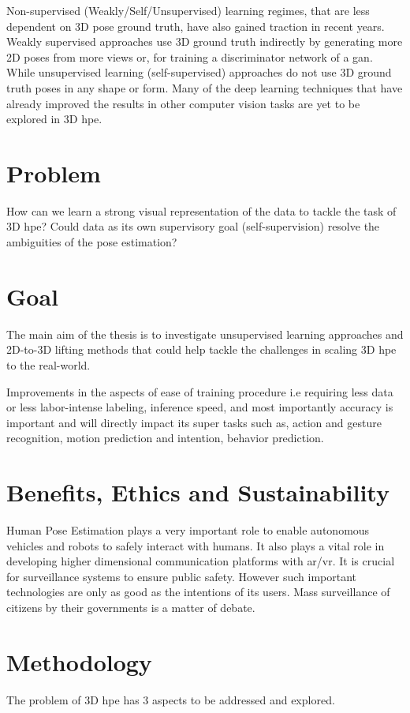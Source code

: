Non-supervised (Weakly/Self/Unsupervised) learning regimes, that are less dependent on 3D pose ground truth, have also gained traction in recent years. Weakly supervised approaches use 3D ground truth indirectly by generating more 2D poses from more views or, for training a discriminator network of a \ac{gan}. While unsupervised learning (self-supervised) approaches do not use 3D ground truth poses in any shape or form. Many of the deep learning techniques that have already improved the results in other computer vision tasks are yet to be explored in 3D \ac{hpe}. 

\section{Problem}
\label{sec:problem}
How can we learn a strong visual representation of the data to tackle the task of 3D \ac{hpe}? Could data as its own supervisory goal (self-supervision) resolve the ambiguities of the pose estimation?

\section{Goal}
\label{sec:goal}
The main aim of the thesis is to investigate unsupervised learning approaches and 2D-to-3D lifting methods that could help tackle the challenges in scaling 3D \ac{hpe} to the real-world.

Improvements in the aspects of ease of training procedure i.e requiring less data or less labor-intense labeling, inference speed, and most importantly accuracy is important and will directly impact its super tasks such as, action and gesture recognition, motion prediction and intention, behavior prediction.

\section{Benefits, Ethics and Sustainability}
Human Pose Estimation plays a very important role to enable autonomous vehicles and robots to safely interact with humans. It also plays a vital role in developing higher dimensional communication platforms with \ac{ar/vr}. It is crucial for surveillance systems to ensure public safety. However such important technologies are only as good as the intentions of its users. Mass surveillance of citizens by their governments is a matter of debate.

\section{Methodology}
\label{sec:methodology}
The problem of 3D \ac{hpe} has 3 aspects to be addressed and explored.

